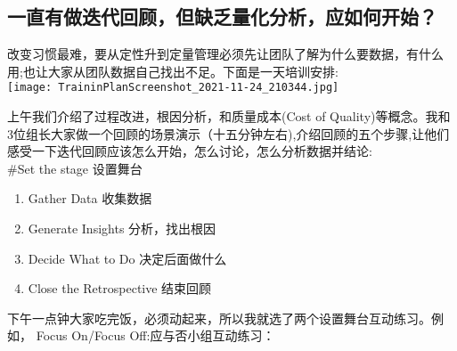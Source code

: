 \hypertarget{ux4e00ux76f4ux6709ux505aux8fedux4ee3ux56deux987eux4f46ux7f3aux4e4fux91cfux5316ux5206ux6790ux5e94ux5982ux4f55ux5f00ux59cb}{%
\subsection{一直有做迭代回顾，但缺乏量化分析，应如何开始？}\label{ux4e00ux76f4ux6709ux505aux8fedux4ee3ux56deux987eux4f46ux7f3aux4e4fux91cfux5316ux5206ux6790ux5e94ux5982ux4f55ux5f00ux59cb}}

改变习惯最难，要从定性升到定量管理必须先让团队了解为什么要数据，有什么用;也让大家从团队数据自己找出不足。下面是一天培训安排:\\

\texttt{[image: TraininPlanScreenshot\_2021-11-24\_210344.jpg]}

上午我们介绍了过程改进，根因分析，和质量成本(Cost of
Quality)等概念。我和3位组长大家做一个回顾的场景演示（十五分钟左右),介绍回顾的五个步骤,让他们感受一下迭代回顾应该怎么开始，怎么讨论，怎么分析数据并结论:\\
\#Set the stage 设置舞台

\begin{enumerate}
\tightlist
\item
  Gather Data 收集数据
\item
  Generate Insights 分析，找出根因
\item
  Decide What to Do 决定后面做什么
\item
  Close the Retrospective 结束回顾
\end{enumerate}

下午一点钟大家吃完饭，必须动起来，所以我就选了两个设置舞台互动练习。例如，
Focus On/Focus Off:应与否小组互动练习：

\begin{description}
\item[]
\end{description}

